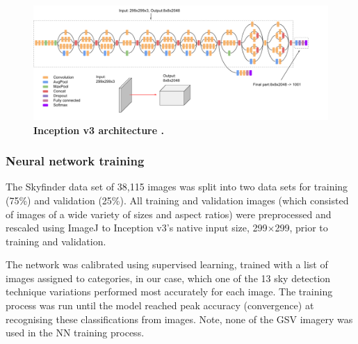 \documentclass[final,3p,times,authoryear]{elsarticle}
\begin{document}

\begin{figure}
\centering    
\includegraphics[scale=0.33]{Images/2/inceptionv3onc--oview.png}
\caption{\bf Inception v3 architecture \citep{Google2019}.}    
 \label{fig:incetption3}  
\end{figure} 

\subsubsection{Neural network training}\label{sec:nntraining}    

The Skyfinder data set of 38,115 images was split into two data sets for training (75\%) and validation (25\%). All training and validation images (which consisted of images of a wide variety of sizes and aspect ratios) were preprocessed and rescaled using ImageJ \citep{Rueden2017} to Inception v3's native input size, 299$\times$299, prior to training and validation. 

The network was calibrated using supervised learning, trained with a list of images assigned to categories, in our case, which one of the 13 sky detection technique variations performed most accurately for each image. The training process was run until the model reached peak accuracy (convergence) at recognising these classifications from images. Note, none of the GSV imagery was used in the NN training process.
\end{document}
